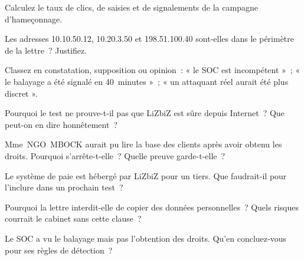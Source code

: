 \bigskip

\begin{boxexo}[title={\ding{45}\quad Exercice~0.1. Le taux \niveaubase}]
Calculez le taux de clics, de saisies et de signalements de la campagne
d'hameçonnage.
\end{boxexo}

\begin{boxexo}[title={\ding{45}\quad Exercice~0.2. Hors périmètre \niveaubase}]
Les adresses 10.10.50.12, 10.20.3.50 et 198.51.100.40 sont-elles dans le
périmètre de la lettre~? Justifiez.
\end{boxexo}

\begin{boxexo}[title={\ding{45}\quad Exercice~0.3. Les registres \niveaubase}]
Classez en constatation, supposition ou opinion~: « le SOC est
incompétent »~; « le balayage a été signalé en 40~minutes »~; « un
attaquant réel aurait été plus discret ».
\end{boxexo}

\begin{boxexo}[title={\ding{45}\quad Exercice~0.4. Prouver \niveaumoyen}]
Pourquoi le test ne prouve-t-il pas que LiZbiZ est sûre depuis Internet~?
Que peut-on en dire honnêtement~?
\end{boxexo}

\begin{boxexo}[title={\ding{45}\quad Exercice~0.5. L'arrêt \niveaumoyen}]
Mme~NGO~MBOCK aurait pu lire la base des clients après avoir obtenu les
droits. Pourquoi s'arrête-t-elle~? Quelle preuve garde-t-elle~?
\end{boxexo}

\begin{boxexo}[title={\ding{45}\quad Exercice~0.6. Le tiers \niveaumoyen}]
Le système de paie est hébergé par LiZbiZ pour un tiers. Que faudrait-il
pour l'inclure dans un prochain test~?
\end{boxexo}

\begin{boxexo}[title={\ding{45}\quad Exercice~0.7. Les données \niveaumoyen}]
Pourquoi la lettre interdit-elle de copier des données personnelles~? Quels
risques courrait le cabinet sans cette clause~?
\end{boxexo}

\begin{boxexo}[title={\ding{45}\quad Exercice~0.8. La détection \niveaumoyen}]
Le SOC a vu le balayage mais pas l'obtention des droits. Qu'en concluez-vous
pour ses règles de détection~?
\end{boxexo}

